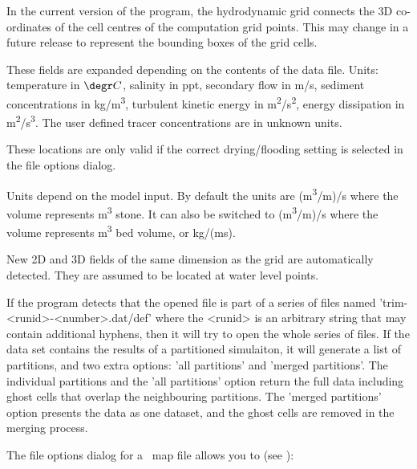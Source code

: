 \begin{enumerate_brackets}
\item In the current version of the program, the hydrodynamic grid connects the 3D co-ordinates of the cell centres of the computation grid points.
This may change in a future release to represent the bounding boxes of the grid cells.
\item These fields are expanded depending on the contents of the data file.
Units: temperature in $\degr C$, salinity in ppt, secondary flow in m/s, sediment concentrations in kg/m\textsuperscript{3}, turbulent kinetic energy in m\textsuperscript{2}/s\textsuperscript{2}, energy dissipation in m\textsuperscript{2}/s\textsuperscript{3}.
The user defined tracer concentrations are in unknown units.
\item These locations are only valid if the correct drying/flooding setting is selected in the file options dialog.
\item Units depend on the model input.
By default the units are (m\textsuperscript{3}/m)/s where the volume represents m\textsuperscript{3} stone.
It can also be switched to (m\textsuperscript{3}/m)/s where the volume represents m\textsuperscript{3} bed volume, or kg/(ms).
\item New 2D and 3D fields of the same dimension as the grid are automatically detected.
They are assumed to be located at water level points.
\end{enumerate_brackets}

\begin{Remark}
\item If the program detects that the opened file is part of a series of files named 'trim-<runid>-\allowbreak<number>.dat/def' where the <runid> is an arbitrary string that may contain additional hyphens, then it will try to open the whole series of files.
If the data set contains the results of a partitioned simulaiton, it will generate a list of partitions, and two extra options: 'all partitions' and 'merged partitions'.
The individual partitions and the 'all partitions' option return the full data including ghost cells that overlap the neighbouring partitions.
The 'merged partitions' option presents the data as one dataset, and the ghost cells are removed in the merging process.
\end{Remark}

The file options dialog for a \DFLOW\ map file allows you to (see ):

